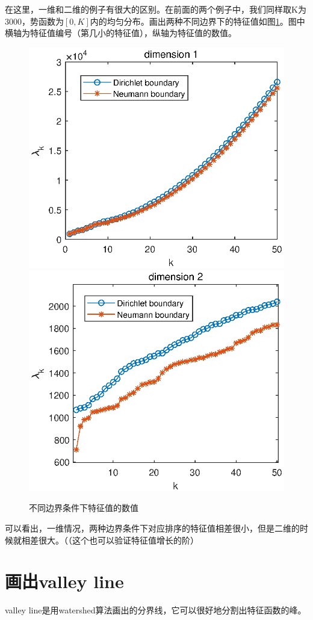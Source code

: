 \documentclass[UTF8,12pt]{article}
\begin{document}
在这里，一维和二维的例子有很大的区别。在前面的两个例子中，我们同样取K为3000，势函数为$[0,K]$内的均匀分布。画出两种不同边界下的特征值如图\ref{f13}。图中横轴为特征值编号（第几小的特征值），纵轴为特征值的数值。

\begin{figure}[htbp]
    \centering
    \includegraphics[width=0.45\linewidth]{pic/lam1d}
    \includegraphics[width=0.45\linewidth]{pic/lam2d}
    \label{f13}
\caption{不同边界条件下特征值的数值}
\end{figure}

可以看出，一维情况，两种边界条件下对应排序的特征值相差很小，但是二维的时候就相差很大。（（这个也可以验证特征值增长的阶）

\section{画出valley line}

valley line是用watershed算法画出的分界线，它可以很好地分割出特征函数的峰。
\end{document}
